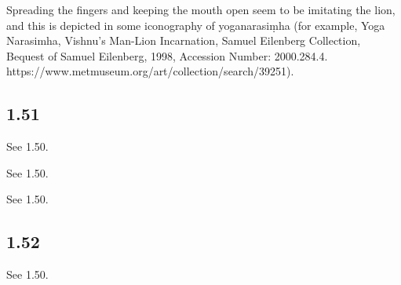 \begin{ekdosis}
\begin{testimonia}[hp01_050]
\begin{versinnote}
\end{versinnote}

\end{testimonia}

\begin{philcomm}[hp01_051]

Spreading the fingers and keeping the mouth open seem to be imitating the lion, and this is depicted in some iconography of yoganarasiṃha (for example, Yoga Narasimha, Vishnu's Man-Lion Incarnation, Samuel Eilenberg Collection, Bequest of Samuel Eilenberg, 1998, Accession Number: 2000.284.4. https://www.metmuseum.org/art/collection/search/39251).  
\end{philcomm}

\subsection*{1.51}
\begin{sources}[hp01_051]
See 1.50.
\end{sources}

\begin{testimonia}[hp01_051]
See 1.50.
\end{testimonia}

\begin{philcomm}[hp01_051]
See 1.50.
\end{philcomm}

\subsection*{1.52}
\begin{sources}[hp01_052]
See 1.50.
\end{sources}


\end{ekdosis}
